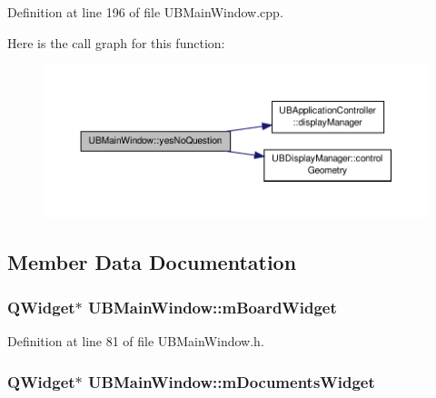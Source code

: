 Definition at line 196 of file U\-B\-Main\-Window.\-cpp.



Here is the call graph for this function\-:
\nopagebreak
\begin{figure}[H]
\begin{center}
\leavevmode
\includegraphics[width=350pt]{d8/d9e/class_u_b_main_window_a4e2df10066f36d2040fca0feb192a5d8_cgraph}
\end{center}
\end{figure}




\subsection{Member Data Documentation}
\hypertarget{class_u_b_main_window_aa64036e9f2bb881efda179dc8456dafb}{
\subsubsection[{m\-Board\-Widget}]{\setlength{\rightskip}{0pt plus 5cm}Q\-Widget$\ast$ U\-B\-Main\-Window\-::m\-Board\-Widget\hspace{0.3cm}{\ttfamily [protected]}}}\label{d8/d9e/class_u_b_main_window_aa64036e9f2bb881efda179dc8456dafb}


Definition at line 81 of file U\-B\-Main\-Window.\-h.

\hypertarget{class_u_b_main_window_ab0686e7ba525d0d7dc7fb86b707ac363}{
\subsubsection[{m\-Documents\-Widget}]{\setlength{\rightskip}{0pt plus 5cm}Q\-Widget$\ast$ U\-B\-Main\-Window\-::m\-Documents\-Widget\hspace{0.3cm}{\ttfamily [protected]}}}\label{d8/d9e/class_u_b_main_window_ab0686e7ba525d0d7dc7fb86b707ac363}


